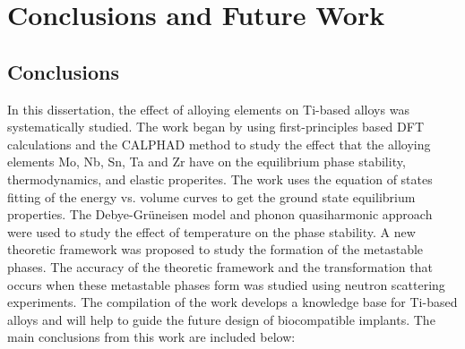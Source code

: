 \chapter{Conclusions and Future Work}

\section{Conclusions}

In this dissertation, the effect of alloying elements on Ti-based alloys was systematically studied. The work began by using first-principles based DFT calculations and the CALPHAD method to study the effect that the alloying elements Mo, Nb, Sn, Ta and Zr have on the equilibrium phase stability, thermodynamics, and elastic properites. The work uses the equation of states fitting of the energy vs. volume curves to get the ground state equilibrium properties. The Debye-Gr\"uneisen model and phonon quasiharmonic approach were used to study the effect of temperature on the phase stability. A new theoretic framework was proposed to study the formation of the metastable phases. The accuracy of the theoretic framework and the transformation that occurs when these metastable phases form was studied using neutron scattering experiments. The compilation of the work develops a knowledge base for Ti-based alloys and will help to guide the future design of biocompatible implants. The main conclusions from this work are included below:

